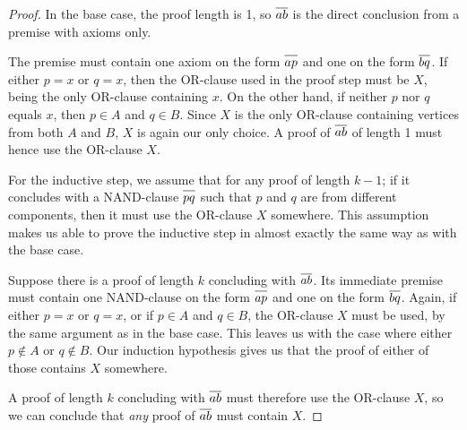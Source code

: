 \begin{proof}
  In the base case, the proof length is 1, so $\ol{ab}$ is the direct conclusion from a premise with axioms only.\par
  \begin{figure}[!h]
    \centering
    \begin{prooftree*}
      \Hypo{\dots}
    \end{prooftree*}
    \caption{}
    \label{fig:ab_proof_bc}
  \end{figure}
  The premise must contain one axiom on the form $\ol{ap}$ and one on the form $\ol{bq}$.
  If either $p = x$ or $q = x$, then the OR-clause used in the proof step must be $X$, being the only OR-clause containing $x$.
  On the other hand, if neither $p$ nor $q$ equals $x$, then $p \in A$ and $q \in B$.
  Since $X$ is the only OR-clause containing vertices from both $A$ and $B$, $X$ is again our only choice.
  A proof of $\ol{ab}$ of length 1 must hence use the OR-clause $X$.

  For the inductive step, we assume that for any proof of length $k-1$; if it concludes with a NAND-clause $\ol{pq}$ such that $p$ and $q$ are from different components, then it must use the OR-clause $X$ somewhere.
  This assumption makes us able to prove the inductive step in almost exactly the same way as with the base case.

  Suppose there is a proof of length $k$ concluding with $\ol{ab}$.
  Its immediate premise must contain one NAND-clause on the form $\ol{ap}$ and one on the form $\ol{bq}$.
  Again, if either $p=x$ or $q=x$, or if $p \in A$ and $q \in B$, the OR-clause $X$ must be used, by the same argument as in the base case.
  This leaves us with the case where either $p \not\in A$ or $q \not\in B$.
  Our induction hypothesis gives us that the proof of either of those contains $X$ somewhere.

  A proof of length $k$ concluding with $\ol{ab}$ must therefore use the OR-clause $X$, so we can conclude that \textit{any} proof of $\ol{ab}$ must contain $X$.
\end{proof}
\pagebreak
